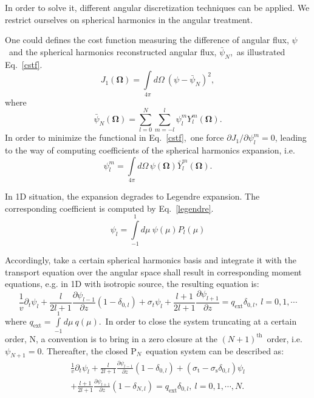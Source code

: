 \documentclass[review]{elsarticle}
\newcommand{\pn}{P$_N$}
\newcommand{\psii}[1]{\psi_\ensuremath{{#1}}}
\begin{document}
In order to solve it, different angular discretization techniques can be applied. We restrict ourselves on spherical harmonics in the angular treatment.

One could defines the cost function measuring the difference of angular flux, $\psi$~and the spherical harmonics reconstructed angular flux, $\bar{\psi}_N$,~as illustrated Eq.~\eqref{cstf}\cite{mccfpn09}.
\begin{equation}\label{cstf1}
J_1(\mathbf{\Omega})=\int\limits_{4\pi}d\Omega~(\psi-\bar{\psi}_N)^2,
\end{equation}
where
\begin{equation}\label{cstf}
\bar{\psi}_N(\mathbf{\Omega})=\sum_{l=0}^N\sum_{m=-l}^{l}\psi_l^mY^m_l(\mathbf{\Omega}).
\end{equation}
In order to minimize the functional in Eq.~\eqref{cstf},~one force $\partial J_1/\partial\psi_l^m=0$, leading to
the way of computing coefficients of the spherical harmonics expansion, i.e.
\begin{equation}
\psi_l^m=\int\limits_{4\pi}d\Omega\,\psi(\mathbf{\Omega})\bar{Y}_l^m(\mathbf{\Omega}).
\end{equation}

In 1D situation, the expansion degrades to Legendre expansion. The corresponding coefficient is computed by Eq.~\eqref{legendre}.
\begin{equation}\label{legendre}
\psi_l=\int\limits_{-1}^{1}d\mu~\psi(\mu)P_l(\mu)
\end{equation}

Accordingly, take a certain spherical harmonics basis and integrate it with the transport equation over the angular space shall result in corresponding moment equations, e.g. in 1D with isotropic source, the resulting equation is:
\begin{equation}
\frac{1}{v}\partial_t\psi_l+\frac{l}{2l+1}\frac{\partial\psi_{l-1}}{\partial z}(1-\delta_{0,l})+\sigma_{t}\psi_l+\frac{l+1}{2l+1}\frac{\partial\psi_{l+1}}{\partial z}=q_\mathrm{ext}\delta_{0,l},~l=0,1,\cdots
\end{equation}
where $\displaystyle q_\mathrm{ext}=\int\limits_{-1}^1d\mu~q(\mu)$.~In order to close the system truncating at a certain order, N, a convention is to bring in a zero closure at the $(N+1)^\mathrm{th}$~order, i.e.~$\psii{N+1}=0$. Thereafter, the closed \pn~equation system can be described as:
\begin{align}\label{pne}
\frac{1}{v}\partial_t\psi_l+\frac{l}{2l+1}\frac{\partial\psi_{l-1}}{\partial z}(1-\delta_{0,l})+(\sigma_\mathrm{t}-\sigma_\mathrm{s}\delta_{0,l})\psi_l\\\nonumber
+\frac{l+1}{2l+1}\frac{\partial\psi_{l+1}}{\partial z}(1-\delta_{N,l})=q_\mathrm{ext}\delta_{0,l},~l=0,1,\cdots,N.
\end{align}
\end{document}
